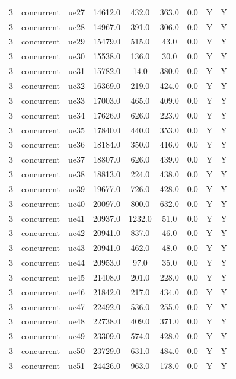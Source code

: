 \begin{table}[ht]
\begin{tabular}{|c|c|c|c|c|c|c|c|c|}
3 & concurrent & ue27 & 14612.0 & 432.0 & 363.0 & 0.0 & Y & Y \\
3 & concurrent & ue28 & 14967.0 & 391.0 & 306.0 & 0.0 & Y & Y \\
3 & concurrent & ue29 & 15479.0 & 515.0 & 43.0 & 0.0 & Y & Y \\
3 & concurrent & ue30 & 15538.0 & 136.0 & 30.0 & 0.0 & Y & Y \\
3 & concurrent & ue31 & 15782.0 & 14.0 & 380.0 & 0.0 & Y & Y \\
3 & concurrent & ue32 & 16369.0 & 219.0 & 424.0 & 0.0 & Y & Y \\
3 & concurrent & ue33 & 17003.0 & 465.0 & 409.0 & 0.0 & Y & Y \\
3 & concurrent & ue34 & 17626.0 & 626.0 & 223.0 & 0.0 & Y & Y \\
3 & concurrent & ue35 & 17840.0 & 440.0 & 353.0 & 0.0 & Y & Y \\
3 & concurrent & ue36 & 18184.0 & 350.0 & 416.0 & 0.0 & Y & Y \\
3 & concurrent & ue37 & 18807.0 & 626.0 & 439.0 & 0.0 & Y & Y \\
3 & concurrent & ue38 & 18813.0 & 224.0 & 438.0 & 0.0 & Y & Y \\
3 & concurrent & ue39 & 19677.0 & 726.0 & 428.0 & 0.0 & Y & Y \\
3 & concurrent & ue40 & 20097.0 & 800.0 & 632.0 & 0.0 & Y & Y \\
3 & concurrent & ue41 & 20937.0 & 1232.0 & 51.0 & 0.0 & Y & Y \\
3 & concurrent & ue42 & 20941.0 & 837.0 & 46.0 & 0.0 & Y & Y \\
3 & concurrent & ue43 & 20941.0 & 462.0 & 48.0 & 0.0 & Y & Y \\
3 & concurrent & ue44 & 20953.0 & 97.0 & 35.0 & 0.0 & Y & Y \\
3 & concurrent & ue45 & 21408.0 & 201.0 & 228.0 & 0.0 & Y & Y \\
3 & concurrent & ue46 & 21842.0 & 217.0 & 434.0 & 0.0 & Y & Y \\
3 & concurrent & ue47 & 22492.0 & 536.0 & 255.0 & 0.0 & Y & Y \\
3 & concurrent & ue48 & 22738.0 & 409.0 & 371.0 & 0.0 & Y & Y \\
3 & concurrent & ue49 & 23309.0 & 574.0 & 428.0 & 0.0 & Y & Y \\
3 & concurrent & ue50 & 23729.0 & 631.0 & 484.0 & 0.0 & Y & Y \\
3 & concurrent & ue51 & 24426.0 & 963.0 & 178.0 & 0.0 & Y & Y \\

\end{tabular}
\end{table}
